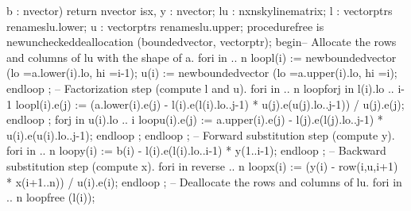                 b : n\Symuns[]vector) \tyxtstxbf[]return%
\tyxtstxendbf[] n\Symuns[]vector \tyxtstxbf[]is\tyxtstxendbf[]
   x, y : n\Symuns[]vector;
   lu   : nxn\Symuns[]skyline\Symuns[]matrix;
   l    : vector\Symuns[]ptrs \tyxtstxbf[]renames\tyxtstxendbf[] lu.lower;
   u    : vector\Symuns[]ptrs \tyxtstxbf[]renames\tyxtstxendbf[] lu.upper;
   \tyxtstxbf[]procedure\tyxtstxendbf[] free \tyxtstxbf[]is%
\tyxtstxendbf[]
      \tyxtstxbf[]new\tyxtstxendbf[] unchecked\Symuns[]deallocation (bounded\Symuns[]vector, vector\Symuns[]ptr);
\tyxtstxbf[]begin\tyxtstxendbf[]
   -- Allocate the rows and columns of lu with the shape of a.
   \tyxtstxbf[]for\tyxtstxendbf[] i \tyxtstxbf[]in%
 .. n \tyxtstxbf[]loop\tyxtstxendbf[]
      l(i) := \tyxtstxbf[]new\tyxtstxendbf[] bounded\Symuns[]vector (lo =\Symgt[] a.lower(i).lo, hi =\Symgt[] i-1);
      u(i) := \tyxtstxbf[]new\tyxtstxendbf[] bounded\Symuns[]vector (lo =\Symgt[] a.upper(i).lo, hi =\Symgt[] i);
   \tyxtstxbf[]end\tyxtstxendbf[] \tyxtstxbf[]loop%
\tyxtstxendbf[];
   -- Factorization step (compute l and u).
   \tyxtstxbf[]for\tyxtstxendbf[] i \tyxtstxbf[]in%
 .. n \tyxtstxbf[]loop\tyxtstxendbf[]
      \tyxtstxbf[]for\tyxtstxendbf[] j \tyxtstxbf[]in%
\tyxtstxendbf[] l(i).lo .. i-1 \tyxtstxbf[]loop\tyxtstxendbf[]
         l(i).e(j) := (a.lower(i).e(j) -
            l(i).e(l(i).lo..j-1) * u(j).e(u(j).lo..j-1)) / u(j).e(j);
      \tyxtstxbf[]end\tyxtstxendbf[] \tyxtstxbf[]loop%
\tyxtstxendbf[];
      \tyxtstxbf[]for\tyxtstxendbf[] j \tyxtstxbf[]in%
\tyxtstxendbf[] u(i).lo .. i \tyxtstxbf[]loop\tyxtstxendbf[]
         u(i).e(j) := a.upper(i).e(j) -
            l(j).e(l(j).lo..j-1) * u(i).e(u(i).lo..j-1);
      \tyxtstxbf[]end\tyxtstxendbf[] \tyxtstxbf[]loop%
\tyxtstxendbf[];
   \tyxtstxbf[]end\tyxtstxendbf[] \tyxtstxbf[]loop%
\tyxtstxendbf[];
   -- Forward substitution step (compute y).
   \tyxtstxbf[]for\tyxtstxendbf[] i \tyxtstxbf[]in%
 .. n \tyxtstxbf[]loop\tyxtstxendbf[]
      y(i) := b(i) - l(i).e(l(i).lo..i-1) * y(1..i-1);
   \tyxtstxbf[]end\tyxtstxendbf[] \tyxtstxbf[]loop%
\tyxtstxendbf[];
   -- Backward substitution step (compute x).
   \tyxtstxbf[]for\tyxtstxendbf[] i \tyxtstxbf[]in%
\tyxtstxendbf[] \tyxtstxbf[]reverse .. n %
\tyxtstxbf[]loop\tyxtstxendbf[]
      x(i) := (y(i) - row(i,u,i+1) * x(i+1..n)) / u(i).e(i);
   \tyxtstxbf[]end\tyxtstxendbf[] \tyxtstxbf[]loop%
\tyxtstxendbf[];
   -- Deallocate the rows and columns of lu.
   \tyxtstxbf[]for\tyxtstxendbf[] i \tyxtstxbf[]in%
 .. n \tyxtstxbf[]loop\tyxtstxendbf[]
      free (l(i));
